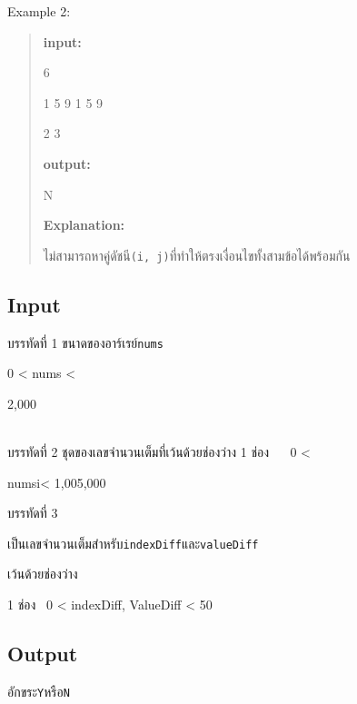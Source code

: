 \documentclass{article}
\begin{document}
{Example 2:}



\begin{quote}

\textbf{input:}



6



1 5 9 1 5 9



2 3



\textbf{output:}



N



\textbf{Explanation:}



ไม่สามารถหาคู่ดัชนี\texttt{(i,\ j)}ที่ทำให้ตรงเงื่อนไขทั้งสามข้อได้พร้อมกัน

\end{quote}



\subsection*{Input}
{บรรทัดที่ 1 ขนาดของอาร์เรย์{\texttt{nums}}{0 \textless{} nums \textless{}

2,000}}\\



บรรทัดที่ 2 ชุดของเลขจำนวนเต็มที่เว้นด้วยช่องว่าง 1 ช่อง ~ ~0 \textless{}

numsi\textless{} 1,005,000



บรรทัดที่ 3

เป็นเลขจำนวนเต็มสำหรับ\texttt{indexDiff}และ\texttt{valueDiff}{เว้นด้วยช่องว่าง

1 ช่อง ~0 \textless{} indexDiff, ValueDiff \textless{} 50}



\subsection*{Output}
อักขระ\texttt{Y}หรือ\texttt{N}\\
\end{document}
